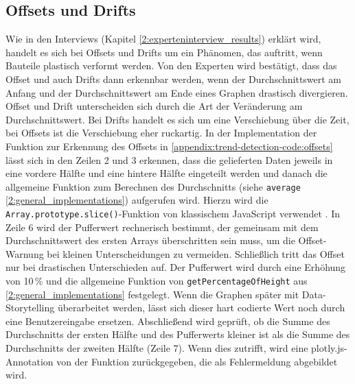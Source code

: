 \subsection{Offsets und Drifts}
Wie in den Interviews (Kapitel \ref{2:experteninterview_results}) erklärt wird, handelt es sich bei Offsets und Drifts um ein Phänomen, das auftritt, wenn Bauteile plastisch verformt werden. Von den Experten wird bestätigt, dass das Offset und auch Drifts dann erkennbar werden, wenn der Durchschnittswert am Anfang und der Durchschnittswert am Ende eines Graphen drastisch divergieren. Offset und Drift unterscheiden sich durch die Art der Veränderung am Durchschnittswert. Bei Drifts handelt es sich um eine Verschiebung über die Zeit, bei Offsets ist die Verschiebung eher ruckartig. In der Implementation der Funktion zur Erkennung des Offsets in \ref{appendix:trend-detection-code:offsets} lässt sich in den Zeilen 2 und 3 erkennen, dass die gelieferten Daten jeweils in eine vordere Hälfte und eine hintere Hälfte eingeteilt werden und danach die allgemeine Funktion zum Berechnen des Durchschnitts (siehe \texttt{average} \ref{2:general_implementations}) aufgerufen wird. Hierzu wird die \texttt{Array.prototype.slice()}-Funktion von klassischem JavaScript verwendet \cite{MDNcontributors.2020}. In Zeile 6 wird der Pufferwert rechnerisch bestimmt, der gemeinsam mit dem Durchschnittswert des ersten Arrays überschritten  sein muss, um die Offset-Warnung bei kleinen Unterscheidungen zu vermeiden. Schließlich tritt das Offset nur bei drastischen Unterschieden auf. Der Pufferwert wird durch eine Erhöhung von 10\,\% und die allgemeine Funktion von \texttt{getPercentageOfHeight} aus \ref{2:general_implementations} festgelegt. Wenn die Graphen später mit Data-Storytelling überarbeitet werden, lässt sich dieser hart codierte Wert noch durch eine Benutzereingabe ersetzen. Abschließend wird geprüft, ob die Summe des Durchschnitts der ersten Hälfte und des Pufferwerts kleiner ist als die Summe des Durchschnitts der zweiten Hälfte (Zeile 7). Wenn dies zutrifft, wird eine plotly.js-Annotation von der Funktion zurückgegeben, die als Fehlermeldung abgebildet wird.

